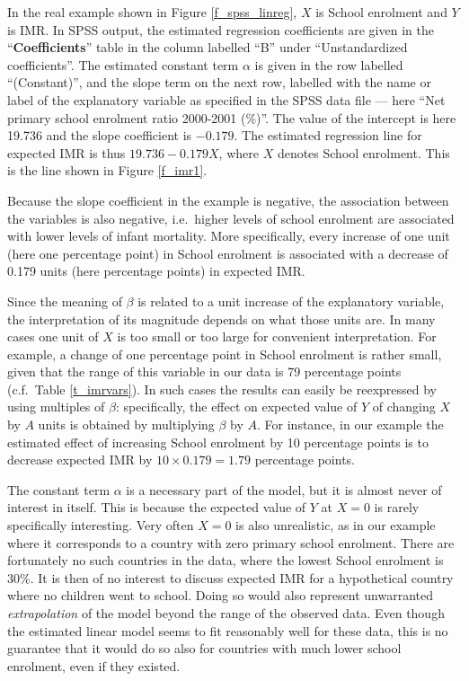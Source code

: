In the real example shown in Figure \ref{f_spss_linreg}, $X$ is School
enrolment and $Y$ is IMR. In SPSS output, the
estimated regression coefficients are given in the
``\textbf{Coefficients}'' table in the column labelled ``B'' under
``Unstandardized coefficients''. The estimated constant
term $\alpha$ is given in the row labelled ``(Constant)'', and the slope
term on the next row, labelled  with the name or label of the
explanatory variable as specified in the SPSS data file --- here ``Net
primary school enrolment ratio 2000-2001 (\%)''.  The value of the
intercept is here 19.736 and the slope coefficient is $-0.179$. The
estimated regression line for expected IMR is thus $19.736-0.179 X$,
where $X$ denotes School enrolment. This is the line shown in
Figure \ref{f_imr1}.

Because the slope coefficient in the example is negative, the
association between the variables is also negative, i.e.\ higher levels
of school enrolment are associated with lower levels of infant
mortality. More specifically, every increase of one unit (here one
percentage point) in School enrolment is associated with a decrease of
0.179 units (here percentage points) in expected IMR.

Since the meaning of $\beta$ is related to a unit increase of the
explanatory variable, the interpretation of its magnitude depends on
what those units are. In many cases one unit of $X$ is too small or too
large for convenient interpretation. For example, a change of one
percentage point in School enrolment is rather small, given that the
range of this variable in our data is 79 percentage points (c.f.\ Table
\ref{t_imrvars}). In such cases the results can easily be reexpressed by
using multiples of $\beta$: specifically, the effect on expected value
of $Y$ of changing $X$ by $A$ units is obtained by multiplying $\beta$
by $A$. For instance, in our example the estimated effect of increasing
School enrolment by 10 percentage points is to decrease expected IMR by
$10\times 0.179=1.79$ percentage points.

The constant term $\alpha$ is a necessary part of the model, but it is
almost never of interest in itself. This is because the expected value
of $Y$ at $X=0$ is rarely specifically interesting. Very often $X=0$ is
also unrealistic, as in our example where it corresponds to a country
with zero primary school enrolment. There are fortunately no such
countries in the data, where the lowest School enrolment is 30\%. It is
then of no interest to discuss expected IMR for a hypothetical country
where no children went to school. Doing so would also represent
unwarranted \emph{extrapolation} of the model beyond the range of the
observed data. Even though the estimated linear model seems to fit
reasonably well for these data, this is no guarantee that it would do so
also for countries with much lower school enrolment, even if they
existed.

